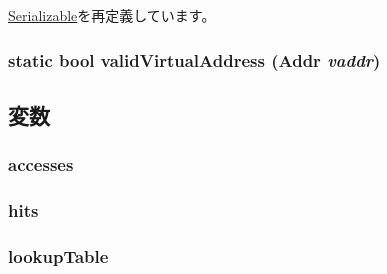\hyperlink{classSerializable_af100c4e9feabf3cd918619c88c718387}{Serializable}を再定義しています。\hypertarget{classPowerISA_1_1TLB_a3e576c3e0d39dfca708baea44ebf0617}{
\subsubsection[{validVirtualAddress}]{\setlength{\rightskip}{0pt plus 5cm}static bool validVirtualAddress ({\bf Addr} {\em vaddr})}}
\label{classPowerISA_1_1TLB_a3e576c3e0d39dfca708baea44ebf0617}


\subsection{変数}
\hypertarget{classPowerISA_1_1TLB_a1929e1032289676f78e07e4c6bc55369}{
\subsubsection[{accesses}]{ {\bf accesses}}}
\label{classPowerISA_1_1TLB_a1929e1032289676f78e07e4c6bc55369}
\hypertarget{classPowerISA_1_1TLB_a224eed77bfb7a27359c9c3c1acbdbfaa}{
\subsubsection[{hits}]{ {\bf hits}}}
\label{classPowerISA_1_1TLB_a224eed77bfb7a27359c9c3c1acbdbfaa}
\hypertarget{classPowerISA_1_1TLB_a4d5c35d797dc31aad758dee75916238f}{
\subsubsection[{lookupTable}]{ {\bf lookupTable}}}
